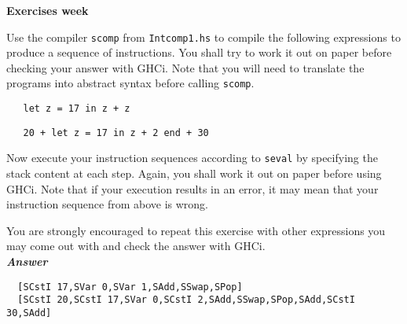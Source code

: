 \documentclass[a4paper]{article}
\begin{document}
\begin{center}
{\Large\bf Exercises week }\\[1ex]
\end{center}


\begin{exercise} 
Use the compiler \texttt{scomp} from \texttt{Intcomp1.hs} to compile the following 
expressions to produce a sequence of instructions. You shall try to work it out on paper before checking your answer with GHCi. 
Note that you will need to translate the programs into abstract syntax before calling \texttt{scomp}. 

{\codesetup\begin{verbatim}
   let z = 17 in z + z
\end{verbatim}}

{\codesetup\begin{verbatim}
   20 + let z = 17 in z + 2 end + 30
\end{verbatim}}

Now execute your instruction sequences according to \texttt{seval} by specifying the stack content at each step. Again, you shall work 
it out on paper before using GHCi. Note that if your execution results in an error, 
it may mean that your instruction sequence from above is wrong. 

You are strongly encouraged to repeat this exercise with other expressions you may come out with and check the answer with GHCi.\\

  \noindent
\textbf{\emph{Answer}}
  {\codesetup\begin{verbatim}
  [SCstI 17,SVar 0,SVar 1,SAdd,SSwap,SPop]
  [SCstI 20,SCstI 17,SVar 0,SCstI 2,SAdd,SSwap,SPop,SAdd,SCstI 30,SAdd]
  \end{verbatim}}

\end{exercise}
\end{document}
